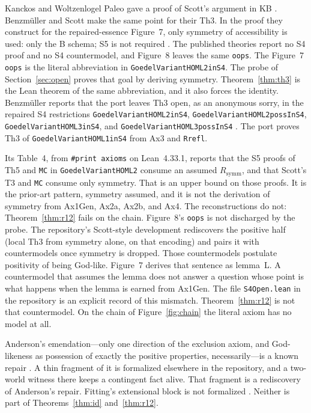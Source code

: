 \documentclass[11pt,a4paper]{article}
\newcommand{\lean}[1]{\texttt{#1}}
\theoremstyle{definition}
\theoremstyle{remark}
\begin{document}
Kanckos and Woltzenlogel Paleo gave a proof of Scott's argument in KB
\cite{kanckos2017}.
Benzm\"uller and Scott make the same point for their Th3.
In the proof they construct for the repaired-essence Figure~7, only symmetry
of accessibility is used: only the B schema; S5 is not required
\cite{benzmuellerScott2025,afpNotes2025}.
The published theories report no S4 proof and no S4 countermodel, and
Figure~8 leaves the same \lean{oops}.
The Figure~7 \lean{oops} is the literal abbreviation in
\lean{GoedelVariantHOML2inS4}.
The probe of Section~\ref{sec:open} proves that goal by deriving symmetry.
Theorem~\ref{thm:th3} is the Lean theorem of the same abbreviation, and it
also forces the identity.
Benzm\"uller reports that the port leaves Th3 open, as an anonymous sorry,
in the repaired S4 restrictions \lean{GoedelVariantHOML2inS4},
\lean{GoedelVariantHOML2possInS4}, \lean{GoedelVariantHOML3inS4}, and
\lean{GoedelVariantHOML3possInS4} \cite{benzmuellerLean2026}.
The port proves Th3 of \lean{GoedelVariantHOML1inS4} from Ax3 and \lean{Rrefl}.

Its Table~4, from \lean{\#print axioms} on Lean~4.33.1, reports that the S5
proofs of Th5 and \lean{MC} in \lean{GoedelVariantHOML2} consume an assumed
\(R_{\mathrm{symm}}\), and that Scott's T3 and \lean{MC} consume only
symmetry.
That is an upper bound on those proofs.
It is the prior-art pattern, symmetry assumed, and it is not the derivation
of symmetry from Ax1Gen, Ax2a, Ax2b, and Ax4.
The reconstructions do not: Theorem~\ref{thm:r12} fails on the chain.
Figure~8's \lean{oops} is not discharged by the probe.
The repository's Scott-style development rediscovers the positive half
(local Th3 from symmetry alone, on that encoding) and pairs it with
countermodels once symmetry is dropped.
Those countermodels postulate positivity of being God-like.
Figure~7 derives that sentence as lemma~L.
A countermodel that assumes the lemma does not answer a question whose point
is what happens when the lemma is earned from Ax1Gen.
The file \lean{S4Open.lean} in the repository is an explicit record of this
mismatch.
Theorem~\ref{thm:r12} is not that countermodel.
On the chain of Figure~\ref{fig:chain} the literal axiom has no model at all.

Anderson's emendation---only one direction of the exclusion axiom, and
God-likeness as possession of exactly the positive properties, necessarily---is
a known repair \cite{anderson1990,andersonGettings1996}.
A thin fragment of it is formalized elsewhere in the repository, and a
two-world witness there keeps a contingent fact alive.
That fragment is a rediscovery of Anderson's repair.
Fitting's extensional block is not formalized \cite{fitting2002}.
Neither is part of Theorems~\ref{thm:id} and~\ref{thm:r12}.
\end{document}
